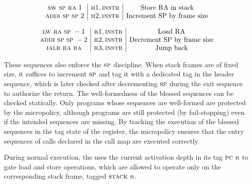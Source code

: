 \documentclass[acmsmall,review,anonymous]{acmart}\settopmatter{printfolios=true,printccs=false,printacmref=false}
\begin{document}
\[
  \begin{array}{c|c|c}
    {\textsc{sw}~ \textsc{sp}~ \textsc{ra}~ 1} & {\textsc{h1}, \textsc{instr}} & \text{Store RA in stack} \\
    {\textsc{addi} ~ \textsc{sp} ~ \textsc{sp} ~ 2} & {\textsc{h2}, \textsc{instr}} & \text{Increment SP by frame size}
  \end{array}
  \]

\[
  \begin{array}{c|c|c}
    {\textsc{lw}~ \textsc{ra}~ \textsc{sp}~ -1} & {\textsc{r1}, \textsc{instr}} & \text{Load RA} \\
    {\textsc{addi} ~ \textsc{sp} ~ \textsc{sp} ~ -2} & {\textsc{r2}, \textsc{instr}} & \text{Decrement SP by frame size} \\
    {\textsc{jalr} ~ \textsc{ra} ~ \textsc{ra}} & {\textsc{r3}, \textsc{instr}} & \text{Jump back}
  \end{array}
\]


These sequences also enforce the $\textsc{sp}$ discipline. When stack frames are of
fixed size, it suffices to increment $\textsc{sp}$ and tag it with a dedicated tag in
the header sequence, which is later checked after decrementing $\textsc{sp}$ during the
exit sequence to authorize the return. The well-formedness of the blessed
sequences can be checked statically. Only programs whose sequences are
well-formed are protected by the micropolicy, although programs are still
protected (by fail-stopping) even if the intended sequences are missing. By
tracking the execution of the blessed sequences in the tag state of the
{\PCname} register, the micropolicy ensures that the entry sequences of calls
declared in the call map are executed correctly.


During normal execution, the {\PCname} uses the current activation depth in its
tag $\textsc{pc} ~ n$ to gate load and store operations, which are allowed to
operate only on the corresponding stack frame, tagged $\textsc{stack} ~ n$.

\end{document}
